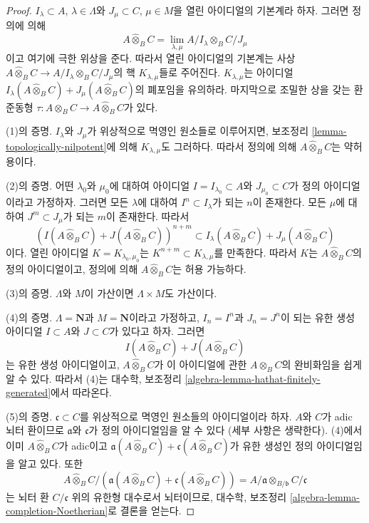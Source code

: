 \begin{proof}
$I_\lambda \subset A$, $\lambda \in \Lambda$와
$J_\mu \subset C$, $\mu \in M$을 열린 아이디얼의 기본계라 하자.
그러면 정의에 의해
$$
A \widehat{\otimes}_B C =
\lim_{\lambda, \mu} A/I_\lambda \otimes_B C/J_\mu
$$
이고 여기에 극한 위상을 준다. 따라서 열린 아이디얼의 기본계는
사상 $A \widehat{\otimes}_B C \to A/I_\lambda \otimes_B C/J_\mu$의
핵 $K_{\lambda, \mu}$들로 주어진다. $K_{\lambda, \mu}$는 아이디얼
$I_\lambda(A \widehat{\otimes}_B C) +
J_\mu(A \widehat{\otimes}_B C)$의 폐포임을 유의하라. 마지막으로
조밀한 상을 갖는 환 준동형
$\tau : A \otimes_B C \to A \widehat{\otimes}_B C$가 있다.

\medskip\noindent
(1)의 증명. $I_\lambda$와 $J_\mu$가 위상적으로 멱영인 원소들로
이루어지면, 보조정리 \ref{lemma-topologically-nilpotent}에 의해
$K_{\lambda, \mu}$도 그러하다. 따라서 정의에 의해
$A \widehat{\otimes}_B C$는 약허용이다.

\medskip\noindent
(2)의 증명. 어떤 $\lambda_0$와 $\mu_0$에 대하여 아이디얼
$I = I_{\lambda_0} \subset A$와 $J_{\mu_0} \subset C$가 정의
아이디얼이라고 가정하자. 그러면 모든 $\lambda$에 대하여
$I^n \subset I_\lambda$가 되는 $n$이 존재한다. 모든 $\mu$에
대하여 $J^m \subset J_\mu$가 되는 $m$이 존재한다. 따라서
$$
\left(I(A \widehat{\otimes}_B C) + J(A \widehat{\otimes}_B C)\right)^{n + m}
\subset
I_\lambda(A \widehat{\otimes}_B C) + J_\mu(A \widehat{\otimes}_B C)
$$
이다. 열린 아이디얼 $K = K_{\lambda_0, \mu_0}$는
$K^{n + m} \subset K_{\lambda, \mu}$를 만족한다. 따라서 $K$는
$A \widehat{\otimes}_B C$의 정의 아이디얼이고, 정의에 의해
$A \widehat{\otimes}_B C$는 허용 가능하다.

\medskip\noindent
(3)의 증명. $\Lambda$와 $M$이 가산이면 $\Lambda \times M$도
가산이다.

\medskip\noindent
(4)의 증명. $\Lambda = \mathbf{N}$과 $M = \mathbf{N}$이라고 가정하고,
$I_n = I^n$과 $J_n = J^n$이 되는 유한 생성 아이디얼
$I \subset A$와 $J \subset C$가 있다고 하자. 그러면
$$
I(A \widehat{\otimes}_B C) + J(A \widehat{\otimes}_B C)
$$
는 유한 생성 아이디얼이고, $A \widehat{\otimes}_B C$가 이
아이디얼에 관한 $A \otimes_B C$의 완비화임을 쉽게 알 수 있다.
따라서 (4)는 대수학, 보조정리
\ref{algebra-lemma-hathat-finitely-generated}에서 따라온다.

\medskip\noindent
(5)의 증명. $\mathfrak c \subset C$를 위상적으로 멱영인 원소들의
아이디얼이라 하자. $A$와 $C$가 adic 뇌터 환이므로
$\mathfrak a$와 $\mathfrak c$가 정의 아이디얼임을 알 수 있다
(세부 사항은 생략한다). (4)에서 이미 $A \widehat{\otimes}_B C$가
adic이고
$\mathfrak a(A \widehat{\otimes}_B C) +
\mathfrak c(A \widehat{\otimes}_B C)$가 유한 생성인 정의
아이디얼임을 알고 있다. 또한
$$
A \widehat{\otimes}_B C /
\left(\mathfrak a(A \widehat{\otimes}_B C) +
\mathfrak c(A \widehat{\otimes}_B C)\right)
=
A/\mathfrak a \otimes_{B/\mathfrak b} C/\mathfrak c
$$
는 뇌터 환 $C/\mathfrak c$ 위의 유한형 대수로서 뇌터이므로,
대수학, 보조정리 \ref{algebra-lemma-completion-Noetherian}로
결론을 얻는다.
\end{proof}









